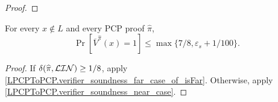 \begin{proof}

\end{proof}


\begin{lemma}[Soundness]
\label{LPCPToPCP.verifier_soundness_of_cases}
\leanok
For every \(x\notin L\) and every PCP proof \(\widehat{\pi}\),
\[
  \Pr[\overline V^{\widehat{\pi}}(x)=1]
  \leq \max\{7/8,\varepsilon_s+1/100\}.
\]
\end{lemma}
\begin{proof}\leanok
If \(\delta({\widehat{\pi}}, {\mathcal{LIN}}) \geq 1 / 8\), apply \ref{LPCPToPCP.verifier_soundness_far_case_of_isFar}. Otherwise, apply
\ref{LPCPToPCP.verifier_soundness_near_case}.
\end{proof}

